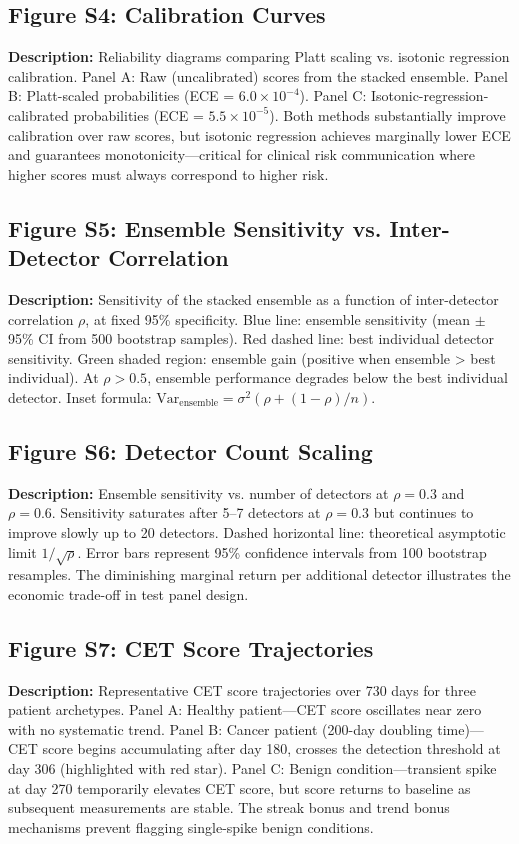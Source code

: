 \documentclass[10pt,a4paper]{article}
\begin{document}
\subsection*{Figure S4: Calibration Curves}
\textbf{Description:} Reliability diagrams comparing Platt scaling vs. isotonic regression calibration. Panel A: Raw (uncalibrated) scores from the stacked ensemble. Panel B: Platt-scaled probabilities (ECE = $6.0 \times 10^{-4}$). Panel C: Isotonic-regression-calibrated probabilities (ECE = $5.5 \times 10^{-5}$). Both methods substantially improve calibration over raw scores, but isotonic regression achieves marginally lower ECE and guarantees monotonicity—critical for clinical risk communication where higher scores must always correspond to higher risk.

\subsection*{Figure S5: Ensemble Sensitivity vs. Inter-Detector Correlation}
\textbf{Description:} Sensitivity of the stacked ensemble as a function of inter-detector correlation $\rho$, at fixed 95\% specificity. Blue line: ensemble sensitivity (mean $\pm$ 95\% CI from 500 bootstrap samples). Red dashed line: best individual detector sensitivity. Green shaded region: ensemble gain (positive when ensemble > best individual). At $\rho > 0.5$, ensemble performance degrades below the best individual detector. Inset formula: $\text{Var}_{\text{ensemble}} = \sigma^2(\rho + (1-\rho)/n)$.

\subsection*{Figure S6: Detector Count Scaling}
\textbf{Description:} Ensemble sensitivity vs. number of detectors at $\rho = 0.3$ and $\rho = 0.6$. Sensitivity saturates after 5--7 detectors at $\rho = 0.3$ but continues to improve slowly up to 20 detectors. Dashed horizontal line: theoretical asymptotic limit $1/\sqrt{\rho}$. Error bars represent 95\% confidence intervals from 100 bootstrap resamples. The diminishing marginal return per additional detector illustrates the economic trade-off in test panel design.

\subsection*{Figure S7: CET Score Trajectories}
\textbf{Description:} Representative CET score trajectories over 730 days for three patient archetypes. Panel A: Healthy patient—CET score oscillates near zero with no systematic trend. Panel B: Cancer patient (200-day doubling time)—CET score begins accumulating after day 180, crosses the detection threshold at day 306 (highlighted with red star). Panel C: Benign condition—transient spike at day 270 temporarily elevates CET score, but score returns to baseline as subsequent measurements are stable. The streak bonus and trend bonus mechanisms prevent flagging single-spike benign conditions.
\end{document}
